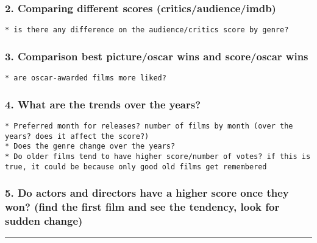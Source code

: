 \documentclass[]{article}
\begin{document}
\hypertarget{comparing-different-scores-criticsaudienceimdb}{%
\subsubsection{2. Comparing different scores
(critics/audience/imdb)}\label{comparing-different-scores-criticsaudienceimdb}}

\begin{verbatim}
* is there any difference on the audience/critics score by genre?
\end{verbatim}

\hypertarget{comparison-best-pictureoscar-wins-and-scoreoscar-wins}{%
\subsubsection{3. Comparison best picture/oscar wins and score/oscar
wins}\label{comparison-best-pictureoscar-wins-and-scoreoscar-wins}}

\begin{verbatim}
* are oscar-awarded films more liked?
\end{verbatim}

\hypertarget{what-are-the-trends-over-the-years}{%
\subsubsection{4. What are the trends over the
years?}\label{what-are-the-trends-over-the-years}}

\begin{verbatim}
* Preferred month for releases? number of films by month (over the years? does it affect the score?)
* Does the genre change over the years?
* Do older films tend to have higher score/number of votes? if this is true, it could be because only good old films get remembered
\end{verbatim}

\hypertarget{do-actors-and-directors-have-a-higher-score-once-they-won-find-the-first-film-and-see-the-tendency-look-for-sudden-change}{%
\subsubsection{5. Do actors and directors have a higher score once they
won? (find the first film and see the tendency, look for sudden
change)}\label{do-actors-and-directors-have-a-higher-score-once-they-won-find-the-first-film-and-see-the-tendency-look-for-sudden-change}}

\begin{center}\rule{0.5\linewidth}{\linethickness}\end{center}
\end{document}
